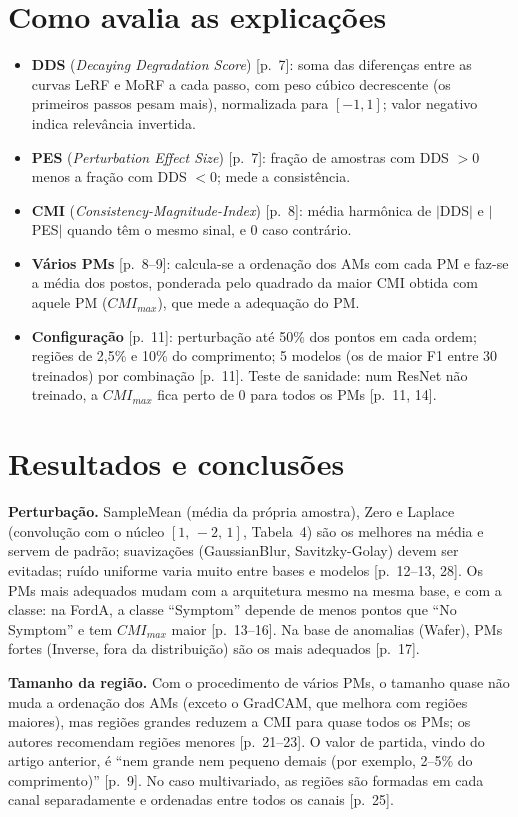 \documentclass[11pt,a4paper]{article}
\begin{document}
\section{Como avalia as explicações}
\begin{itemize}
\item \textbf{DDS} (\textit{Decaying Degradation Score}) [p.~7]: soma das diferenças entre as curvas LeRF e MoRF a cada passo, com peso cúbico decrescente (os primeiros passos pesam mais), normalizada para $[-1,1]$; valor negativo indica relevância invertida.
\item \textbf{PES} (\textit{Perturbation Effect Size}) [p.~7]: fração de amostras com DDS $>0$ menos a fração com DDS $<0$; mede a consistência.
\item \textbf{CMI} (\textit{Consistency-Magnitude-Index}) [p.~8]: média harmônica de $|$DDS$|$ e $|$PES$|$ quando têm o mesmo sinal, e 0 caso contrário.
\item \textbf{Vários PMs} [p.~8--9]: calcula-se a ordenação dos AMs com cada PM e faz-se a média dos postos, ponderada pelo quadrado da maior CMI obtida com aquele PM ($CMI_{max}$), que mede a adequação do PM.
\item \textbf{Configuração} [p.~11]: perturbação até 50\% dos pontos em cada ordem; regiões de 2,5\% e 10\% do comprimento; 5 modelos (os de maior F1 entre 30 treinados) por combinação [p.~11]. Teste de sanidade: num ResNet não treinado, a $CMI_{max}$ fica perto de 0 para todos os PMs [p.~11, 14].
\end{itemize}

\section{Resultados e conclusões}
\textbf{Perturbação.} SampleMean (média da própria amostra), Zero e Laplace (convolução com o núcleo $[1,\,-2,\,1]$, Tabela~4) são os melhores na média e servem de padrão; suavizações (GaussianBlur, Savitzky-Golay) devem ser evitadas; ruído uniforme varia muito entre bases e modelos [p.~12--13, 28]. Os PMs mais adequados mudam com a arquitetura mesmo na mesma base, e com a classe: na FordA, a classe ``Symptom'' depende de menos pontos que ``No Symptom'' e tem $CMI_{max}$ maior [p.~13--16]. Na base de anomalias (Wafer), PMs fortes (Inverse, fora da distribuição) são os mais adequados [p.~17].

\textbf{Tamanho da região.} Com o procedimento de vários PMs, o tamanho quase não muda a ordenação dos AMs (exceto o GradCAM, que melhora com regiões maiores), mas regiões grandes reduzem a CMI para quase todos os PMs; os autores recomendam regiões menores [p.~21--23]. O valor de partida, vindo do artigo anterior, é ``nem grande nem pequeno demais (por exemplo, 2--5\% do comprimento)'' [p.~9]. No caso multivariado, as regiões são formadas em cada canal separadamente e ordenadas entre todos os canais [p.~25].
\end{document}
